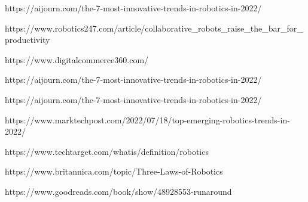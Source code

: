 \documentclass{report}
\begin{document}
\begin{thebibliography}{99}
	
	https://aijourn.com/the-7-most-innovative-trends-in-robotics-in-2022/
	
	https://www.robotics247.com/article/collaborative\_robots\_raise\_the\_bar\_for\_productivity
	
	https://www.digitalcommerce360.com/
	
	https://aijourn.com/the-7-most-innovative-trends-in-robotics-in-2022/
	
	https://aijourn.com/the-7-most-innovative-trends-in-robotics-in-2022/
	
	https://www.marktechpost.com/2022/07/18/top-emerging-robotics-trends-in-2022/
	
	https://www.techtarget.com/whatis/definition/robotics
	
	https://www.britannica.com/topic/Three-Laws-of-Robotics
	
	https://www.goodreads.com/book/show/48928553-runaround
	
\end{thebibliography}
\end{document}
